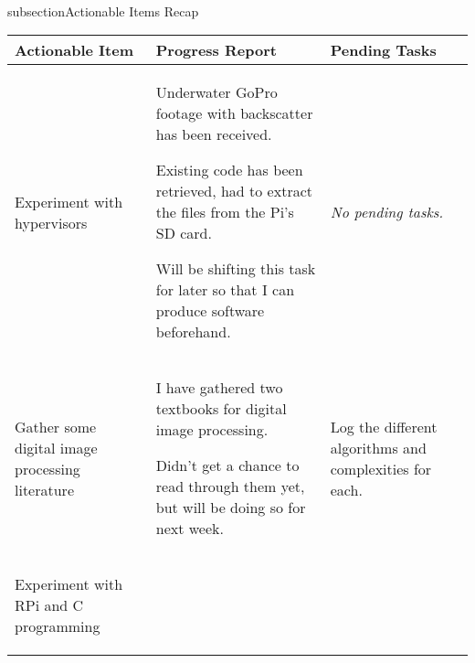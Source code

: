 \\subsection{Actionable Items Recap}

\begin{table}[!h]
    \centering
    \begin{tabularx}{\textwidth}{|X|X|X|}
        \hline
        Actionable Item & Progress Report & Pending Tasks \\
        \hline
        \hline
        \begin{myitemize}
            \item Experiment with hypervisors
        \end{myitemize} & 
        \begin{myitemize}
            \item Underwater GoPro footage with backscatter has been received.
            \item Existing code has been retrieved, had to extract the files from the Pi's SD card.
            \item Will be shifting this task for later so that I can produce software beforehand.
        \end{myitemize} & 
        \begin{myitemize}
            \item \textit{No pending tasks.}
        \end{myitemize} \\
        \hline
        \begin{myitemize}
            \item Gather some digital image processing literature
        \end{myitemize} & 
        \begin{myitemize}
            \item I have gathered two textbooks for digital image processing.
            \item Didn't get a chance to read through them yet, but will be doing so for next week.
        \end{myitemize} & 
        \begin{myitemize}
            \item Log the different algorithms and complexities for each.
        \end{myitemize} \\
        \hline
        \begin{myitemize}
            \item Experiment with RPi and C programming
        \end{myitemize} & 

\end{tabularx}
\end{table}

